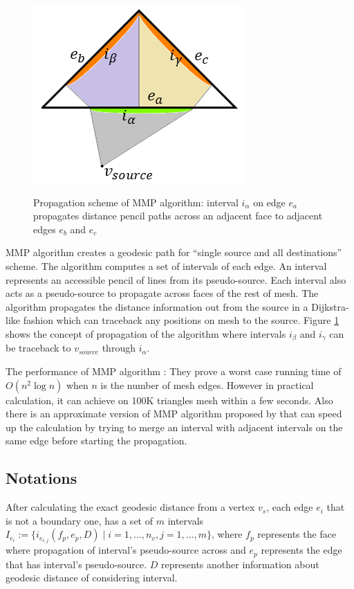 \documentclass[a4paper,twoside]{article}
\begin{document}
\begin{figure}[!h]
	\centering
	{\includegraphics[width=0.75\columnwidth]{images/mmp_algorithm.png}}
	\caption{Propagation scheme of MMP algorithm: interval $i_{\alpha}$ on edge $e_a$ propagates distance pencil paths across an adjacent face to adjacent edges $e_b$ and $e_c$ }
	\label{fig:mmp algorithm}
\end{figure}

MMP algorithm creates a geodesic path for ``single source and all destinations'' scheme. The algorithm computes a set of intervals of each edge. An interval represents an accessible pencil of lines from its pseudo-source. Each interval also acts as a pseudo-source to propagate across faces of the rest of mesh. The algorithm propagates the distance information out from the source in a Dijkstra-like fashion which can traceback any positions on mesh to the source. Figure \ref{fig:mmp algorithm} shows the concept of propagation of the algorithm where intervals $i_{\beta}$ and $i_{\gamma}$ can be traceback to $v_{source}$ through $i_{\alpha}$.

The performance of MMP algorithm : They prove a worst case
running time of $O(n^2 \log n)$ when $n$ is the number of mesh edges. However in practical calculation, it can achieve on 100K triangles mesh within a few seconds. Also there is an approximate version of MMP algorithm proposed by \cite{Surazhsky:2005:FEA:1073204.1073228} that can speed up the calculation by trying to merge an interval with adjacent intervals on the same edge before starting the propagation.

\subsection*{Notations}
After calculating the exact geodesic distance from a vertex $v_s$, each edge $e_i$ that is not a boundary one, has a set of $m$ intervals $I_{e_i}:=\{ i_{e_{i,j}}(f_p,e_p,D) \mid i = 1, ... ,n_v , j = 1,...,m\}$, where $f_p$ represents the face where propagation of interval's pseudo-source across and $e_p$ represents the edge that has interval's pseudo-source. $D$ represents another information about geodesic distance of considering interval.
\end{document}

